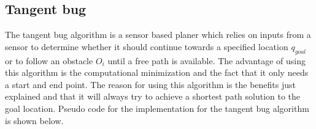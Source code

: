 \documentclass[../Head/Main.tex]{subfiles}
\begin{document}
\subsection{Tangent bug}

The tangent bug algorithm is a sensor based planer which relies on inputs from a sensor to determine whether it should continue towards a  specified location $q_{goal}$ or to follow an obstacle $O_i$ until a free path is available. The advantage of using this algorithm is the computational minimization and the fact that it only needs a start and end point. The reason for using this algorithm is the benefits just explained and that it will always try to achieve a shortest path solution to the goal location. Pseudo code for the implementation for the tangent bug algorithm is shown below.        
\end{document}
